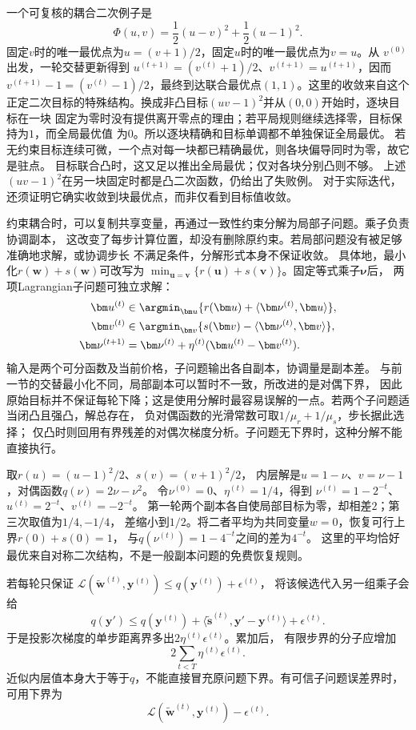 一个可复核的耦合二次例子是
\[
  \Phi(u,v)=\frac12(u-v)^2+\frac12(u-1)^2.
\]
固定$v$时的唯一最优点为$u=(v+1)/2$，固定$u$时的唯一最优点为$v=u$。从
$v^{(0)}$出发，一轮交替更新得到
$u^{(t+1)}=(v^{(t)}+1)/2$、$v^{(t+1)}=u^{(t+1)}$，因而
$v^{(t+1)}-1=(v^{(t)}-1)/2$，最终到达联合最优点$(1,1)$。这里的收敛来自这个
正定二次目标的特殊结构。换成非凸目标$(uv-1)^2$并从$(0,0)$开始时，逐块目标在一块
固定为零时没有提供离开零点的理由；若平局规则继续选择零，目标保持为$1$，而全局最优值
为$0$。所以逐块精确和目标单调都不单独保证全局最优。
若无约束目标连续可微，一个点对每一块都已精确最优，则各块偏导同时为零，故它是驻点。
目标联合凸时，这又足以推出全局最优；仅对各块分别凸则不够。
上述$(uv-1)^2$在另一块固定时都是凸二次函数，仍给出了失败例。
对于实际迭代，还须证明它确实收敛到块最优点，而非仅看到目标值收敛。

约束耦合时，可以复制共享变量，再通过一致性约束分解为局部子问题。乘子负责协调副本，
这改变了每步计算位置，却没有删除原约束。若局部问题没有被足够准确地求解，或协调步长
不满足条件，分解形式本身不保证收敛。
具体地，最小化$r(\bm w)+s(\bm w)$可改写为
$\min_{\bm u=\bm v}\{r(\bm u)+s(\bm v)\}$。固定等式乘子$\bm\nu$后，
两项Lagrangian子问题可独立求解：
\begin{align}
 \bm u^{(t)}&\in\argmin_{\bm u}\{r(\bm u)+\langle\bm\nu^{(t)},\bm u\rangle\},\nonumber\\
 \bm v^{(t)}&\in\argmin_{\bm v}\{s(\bm v)-\langle\bm\nu^{(t)},\bm v\rangle\},\nonumber\\
 \bm\nu^{(t+1)}&=\bm\nu^{(t)}+\eta^{(t)}(\bm u^{(t)}-\bm v^{(t)}).
 \label{eq:opt-consensus-dual-decomposition}
\end{align}
输入是两个可分函数及当前价格，子问题输出各自副本，协调量是副本差。
与前一节的交替最小化不同，局部副本可以暂时不一致，所改进的是对偶下界，
因此原始目标并不保证每轮下降；这是使用分解时最容易误解的一点。若两个子问题适当闭凸且强凸，解总存在，
负对偶函数的光滑常数可取$1/\mu_r+1/\mu_s$，步长据此选择；
仅凸时则回用有界残差的对偶次梯度分析。子问题无下界时，这种分解不能直接执行。

取$r(u)=(u-1)^2/2$、$s(v)=(v+1)^2/2$，
内层解是$u=1-\nu$、$v=\nu-1$，对偶函数$q(\nu)=2\nu-\nu^2$。
令$\nu^{(0)}=0$、$\eta^{(t)}=1/4$，得到
$\nu^{(t)}=1-2^{-t}$、$u^{(t)}=2^{-t}$、$v^{(t)}=-2^{-t}$。
第一轮两个副本各自使局部目标为零，却相差$2$；第三次取值为$1/4,-1/4$，
差缩小到$1/2$。将二者平均为共同变量$w=0$，恢复可行上界$r(0)+s(0)=1$，
与$q(\nu^{(t)})=1-4^{-t}$之间的差为$4^{-t}$。
这里的平均恰好最优来自对称二次结构，不是一般副本问题的免费恢复规则。

若每轮只保证
$\mathcal L(\widetilde{\bm w}^{(t)},\bm y^{(t)})\leq q(\bm y^{(t)})+\epsilon^{(t)}$，
将该候选代入另一组乘子会给
\[
 q(\bm y')\leq q(\bm y^{(t)})
 +\langle\widetilde{\bm s}^{(t)},\bm y'-\bm y^{(t)}\rangle+\epsilon^{(t)}.
\]
于是投影次梯度的单步距离界多出$2\eta^{(t)}\epsilon^{(t)}$。累加后，
有限步界的分子应增加
\[
 2\sum_{t<T}\eta^{(t)}\epsilon^{(t)}.
\]
近似内层值本身大于等于$q$，不能直接冒充原问题下界。有可信子问题误差界时，
可用下界为
\[
 \mathcal L(\widetilde{\bm w}^{(t)},\bm y^{(t)})-\epsilon^{(t)}.
\]

